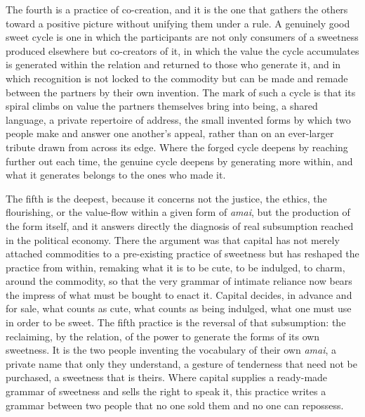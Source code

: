 \documentclass[11pt,a4paper]{article}
\begin{document}
The fourth is a practice of co-creation, and it is the one that gathers the others toward a positive picture without unifying them under a rule. A genuinely good sweet cycle is one in which the participants are not only consumers of a sweetness produced elsewhere but co-creators of it, in which the value the cycle accumulates is generated within the relation and returned to those who generate it, and in which recognition is not locked to the commodity but can be made and remade between the partners by their own invention. The mark of such a cycle is that its spiral climbs on value the partners themselves bring into being, a shared language, a private repertoire of address, the small invented forms by which two people make and answer one another's appeal, rather than on an ever-larger tribute drawn from across its edge. Where the forged cycle deepens by reaching further out each time, the genuine cycle deepens by generating more within, and what it generates belongs to the ones who made it.

The fifth is the deepest, because it concerns not the justice, the ethics, the flourishing, or the value-flow within a given form of \textit{amai}, but the production of the form itself, and it answers directly the diagnosis of real subsumption reached in the political economy. There the argument was that capital has not merely attached commodities to a pre-existing practice of sweetness but has reshaped the practice from within, remaking what it is to be cute, to be indulged, to charm, around the commodity, so that the very grammar of intimate reliance now bears the impress of what must be bought to enact it. Capital decides, in advance and for sale, what counts as cute, what counts as being indulged, what one must use in order to be sweet. The fifth practice is the reversal of that subsumption: the reclaiming, by the relation, of the power to generate the forms of its own sweetness. It is the two people inventing the vocabulary of their own \textit{amai}, a private name that only they understand, a gesture of tenderness that need not be purchased, a sweetness that is theirs. Where capital supplies a ready-made grammar of sweetness and sells the right to speak it, this practice writes a grammar between two people that no one sold them and no one can repossess.
\end{document}

